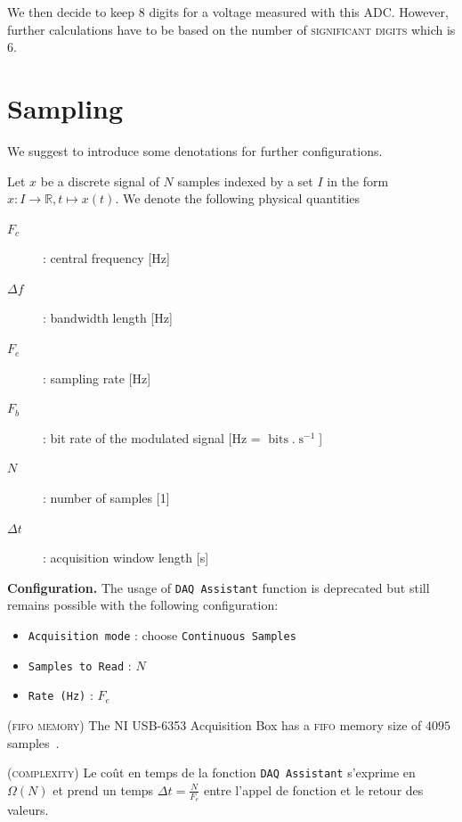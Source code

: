 \documentclass[a4paper]{report}
\newenvironment{notation}[1][Notation.]{\begin{trivlist}
\item[\hskip \labelsep {\bfseries #1}]}{\end{trivlist}}
\newenvironment{remark}[1][Remark.]{\begin{trivlist}
\item[\hskip \labelsep {\bfseries #1}]}{\end{trivlist}}
\begin{document}
We then decide to keep $8$ digits for a voltage measured with this ADC. However, further calculations have to be based on the number of \textsc{significant digits} which is $6$. 

\section{Sampling}
We suggest to introduce some denotations for further configurations.

\begin{notation}
  Let $x$ be a discrete signal of $N$ samples indexed by a set $I$ in the form $x : I \rightarrow \mathbb{R}, t \mapsto x(t)$. We denote the following physical quantities
  \begin{description}
  \item[$F_c$]{ : central frequency [Hz]}
  \item[$\Delta f$]{ : bandwidth length [Hz]}
  \item[$F_e$]{ : sampling rate [Hz]}
  \item[$F_b$]{ : bit rate of the modulated signal [Hz = $\operatorname{bits}.\operatorname{s}^{-1}$]}
  \item[$N$]{ : number of samples [1]}
  \item[$\Delta t$]{ : acquisition window length [s]}
  \end{description}
\end{notation}

\noindent
\textbf{Configuration.} The usage of \texttt{DAQ Assistant} function is deprecated but still remains possible with the following configuration:
\begin{itemize}
  \item{\texttt{Acquisition mode} : choose \texttt{Continuous Samples}}~\cite{NI_continuous_samp}
  \item{\texttt{Samples to Read} : $N$}
  \item{\texttt{Rate (Hz)} : $F_e$}
\end{itemize}

\begin{remark}
  (\textsc{fifo memory})
  The NI USB-6353 Acquisition Box has a \textsc{fifo} memory size of $4095$ samples~\cite{NI_6353_datasheet}.
\end{remark}

\begin{remark}
  \textsc{(complexity)}
  Le co\^ut en temps de la fonction \texttt{DAQ Assistant} s'exprime en $\Omega(N)$\cite{omega} et prend un temps $\Delta t = \frac{N}{F_e}$ entre l'appel de fonction et le retour des valeurs.
\end{remark}
\end{document}
